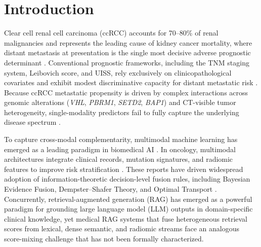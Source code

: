 \section{Introduction}
\label{sec:intro}

Clear cell renal cell carcinoma (ccRCC) accounts for 70--80\% of renal malignancies and represents the leading cause of kidney cancer mortality, where distant metastasis at presentation is the single most decisive adverse prognostic determinant \cite{schulz2021multimodal, zang2025multimodal, chi2026multimodal}. Conventional prognostic frameworks, including the TNM staging system, Leibovich score, and UISS, rely exclusively on clinicopathological covariates and exhibit modest discriminative capacity for distant metastatic risk \cite{yang2024multimodal}. Because ccRCC metastatic propensity is driven by complex interactions across genomic alterations (\textit{VHL}, \textit{PBRM1}, \textit{SETD2}, \textit{BAP1}) and CT-visible tumor heterogeneity, single-modality predictors fail to fully capture the underlying disease spectrum \cite{schulz2021multimodal, ma2025genomic}.

To capture cross-modal complementarity, multimodal machine learning has emerged as a leading paradigm in biomedical AI \cite{quellec2010dezert, fontani2013dempster, baltrusaitis2018multimodal, huang2020fusion, kline2022multimodal, stahlschmidt2021multimodal}. In oncology, multimodal architectures integrate clinical records, mutation signatures, and radiomic features to improve risk stratification \cite{schulz2021multimodal, mahootiha2023multimodal, yang2024multimodal, zang2025multimodal, chi2026multimodal, xiao2026urofusion}. These reports have driven widespread adoption of information-theoretic decision-level fusion rules, including Bayesian Evidence Fusion, Dempster--Shafer Theory, and Optimal Transport \cite{quellec2010dezert, fontani2013dempster, liu2017weighted, courty2016optimal, shao2023deep, huang2024deep}. Concurrently, retrieval-augmented generation (RAG) has emerged as a powerful paradigm for grounding large language model (LLM) outputs in domain-specific clinical knowledge, yet medical RAG systems that fuse heterogeneous retrieval scores from lexical, dense semantic, and radiomic streams face an analogous score-mixing challenge that has not been formally characterized.

